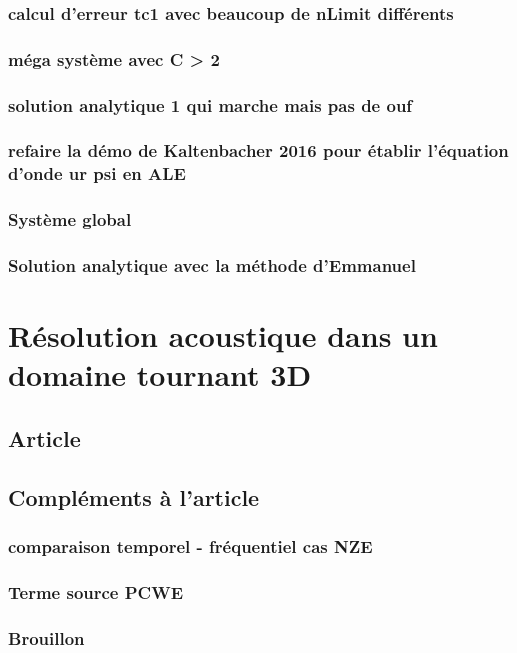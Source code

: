         \subsection{calcul d'erreur tc1 avec beaucoup de nLimit différents}
        \subsection{méga système avec C > 2}
        \subsection{solution analytique 1 qui marche mais pas de ouf }
        \subsection{refaire la démo de Kaltenbacher 2016 pour établir l'équation d'onde ur psi en ALE}
        \subsection{Système global}
        \subsection{Solution analytique avec la méthode d'Emmanuel}


\chapter{Résolution acoustique dans un domaine tournant 3D}
    \label{section:chap3D}
    \section{Article }
    \section{Compléments à l'article}
        \subsection{comparaison temporel - fréquentiel cas NZE}
        \subsection{Terme source PCWE}
        \subsection{Brouillon}
            




    
